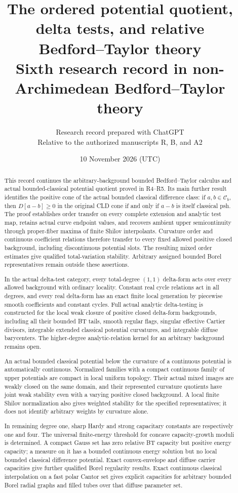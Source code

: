\documentclass[11pt,a4paper]{article}
\title{The ordered potential quotient,\\
delta tests, and relative\\
Bedford--Taylor theory\\[5pt]
\large Sixth research record in non-Archimedean Bedford--Taylor theory}
\author{Research record prepared with ChatGPT\\
\small Relative to the authorized manuscripts R, B, and A2}
\date{10 November 2026 (UTC)}
\numberwithin{equation}{section}
\theoremstyle{definition}
\theoremstyle{remark}
\begin{document}
\maketitle
\begin{abstract}
This record continues the arbitrary-background bounded Bedford--Taylor
calculus and actual bounded-classical potential quotient proved in
R4--R5. Its main further result identifies the positive cone of the
actual bounded classical difference class: if $a,b\in\mathcal C_b$,
then $D[a-b]\ge0$ in the original CLD cone if and only if $a-b$ is
itself classical psh. The proof establishes order transfer on every
complete extension and analytic test map, retains actual curve endpoint
values, and recovers ambient upper semicontinuity through proper-fiber
maxima of finite Shilov interpolants. Curvature order and continuous
coefficient relations therefore transfer to every fixed allowed
positive closed background, including discontinuous potential slots.
The resulting mixed order estimates give qualified total-variation
stability. Arbitrary assigned bounded Borel representatives remain
outside these assertions.

In the actual delta-test category, every total-degree $(1,1)$ delta-form
acts over every allowed background with ordinary locality. Constant
real cycle relations act in all degrees, and every real delta-form has
an exact finite local generation by piecewise smooth coefficients and
constant cycles. Full actual analytic delta-testing is constructed for
the local weak closure of positive closed delta-form backgrounds,
including all their bounded BT tails, smooth regular flags, singular
effective Cartier divisors, integrable extended classical potential
curvatures, and integrable diffuse barycenters. The higher-degree analytic-relation
kernel for an arbitrary background remains open.

An actual bounded classical potential below the curvature of a
continuous potential is automatically continuous. Normalized families
with a compact continuous family of upper potentials are compact in
local uniform topology. Their actual mixed images are weakly closed on
the same domain, and their represented curvature quotients have joint
weak stability even with a varying positive closed background. A local
finite Shilov normalization also gives weighted stability for the
specified representatives; it does not identify arbitrary weights by
curvature alone.

In remaining degree one, sharp Hardy and strong capacitary constants
are respectively one and four. The universal finite-energy threshold
for concave capacity-growth moduli is determined. A compact Gauss set
has zero relative BT capacity but positive energy capacity; a measure
on it has a bounded continuous energy solution but no local bounded
classical difference potential. Exact convex-envelope and diffuse
carrier capacities give further qualified Borel regularity results.
Exact continuous classical interpolation on a fast polar Cantor set
gives explicit capacities for arbitrary bounded Borel radial graphs
and filled tubes over that diffuse parameter set.


\end{abstract}
\end{document}
